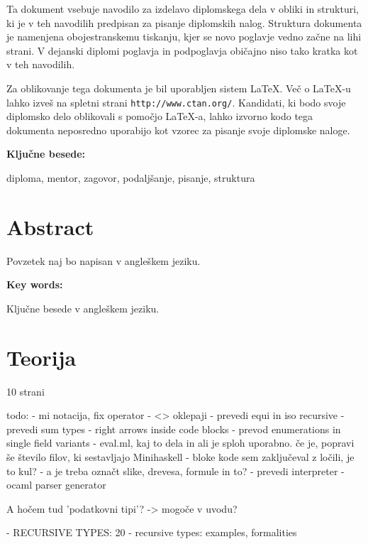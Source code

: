 \documentclass[12pt,a4paper,openany]{book}
\begin{document}
Ta dokument vsebuje navodilo za izdelavo diplomskega dela v obliki in strukturi, ki je v teh navodilih predpisan za
pisanje diplomskih nalog. Struktura dokumenta je namenjena obojestranskemu tiskanju, kjer se novo poglavje vedno za\v cne na lihi strani.
V dejanski diplomi poglavja in podpogla\-vja  obi\v cajno niso tako kratka kot v teh navodilih.

Za oblikovanje tega dokumenta je bil uporabljen sistem \LaTeX.
Ve\v c o \LaTeX-u lahko izve\v s na spletni strani \texttt{http://www.ctan.org/}.
Kandidati, ki bodo svoje diplomsko delo oblikovali s pomo\v cjo
\LaTeX-a, lahko izvorno kodo tega dokumenta neposredno uporabijo kot vzorec za pisanje svoje diplomske naloge.

\vspace{1.3cm}
\noindent
{\large \bf Ključne besede:}

\vspace{0.5cm}
\noindent
diploma, mentor, zagovor, podaljšanje, pisanje, struktura


\chapter*{Abstract}


Povzetek naj bo napisan v angleškem jeziku.

\vspace{1.3cm}
\noindent
{\large \bf Key words:}

\vspace{0.5cm}
\noindent
Ključne besede v angleškem jeziku.



\chapter{Teorija}
10 strani

todo: 
- mi notacija, fix operator
- <> oklepaji
- prevedi equi in iso recursive
- prevedi sum types
- right arrows inside code blocks
- prevod enumerations in single field variants
- eval.ml, kaj to dela in ali je sploh uporabno. če je, popravi še število filov, ki sestavljajo Minihaskell
- bloke kode sem zaključeval z ločili, je to kul?
- a je treba označt slike, drevesa, formule in to?
- prevedi interpreter
- ocaml parser generator

A hočem tud 'podatkovni tipi'? -> mogoče v uvodu?

- RECURSIVE TYPES:  	20 - recursive types: examples, formalities
\end{document}
